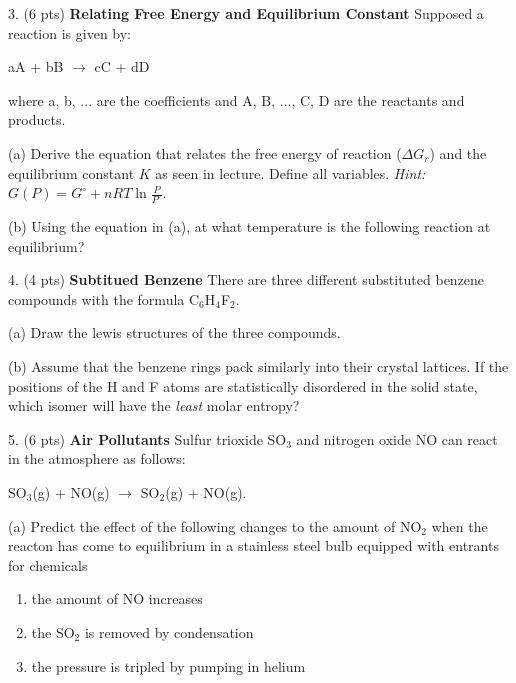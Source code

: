 \documentclass[11pt]{article}
\begin{document}
\vspace{3in}

3. (6 pts) \textbf{Relating Free Energy and Equilibrium Constant} Supposed a reaction
is given by:
\begin{center}
  aA + bB $\rightarrow$ cC + dD
\end{center}
where a, b, ... are the coefficients and A, B, ..., C, D are the reactants and products.

(a) Derive the equation that relates the free energy of reaction ($\Delta G_r$) and the
equilibrium constant $K$ as seen in lecture. Define all variables. \textit{Hint:}
$G(P) = G^\circ + nRT \ln\frac{P}{P^\circ}$.

(b) Using the equation in (a), at what temperature is the following reaction at equilibrium?
\begin{center}
\end{center}


\vspace{3in}

%
%

4. (4 pts) \textbf{Subtitued Benzene} There are three different substituted benzene compounds
with the formula C$_6$H$_4$F$_2$.

(a) Draw the lewis structures of the three compounds.

(b) Assume that the benzene rings pack similarly into their crystal lattices. If the positions
of the H and F atoms are statistically disordered in the solid state, which isomer will have
the \textit{least} molar entropy?

\vspace{3in}

5. (6 pts) \textbf{Air Pollutants} Sulfur trioxide SO$_3$ and nitrogen oxide NO can react in
the atmosphere as follows:
\begin{center}
  SO$_3$(g) + NO(g) $\rightarrow$ SO$_2$(g) + NO(g).
\end{center}
(a) Predict the effect of the following changes to the amount of NO$_2$ when the reacton
has come to equilibrium in a stainless steel bulb equipped with entrants for chemicals
\begin{enumerate}
\item the amount of NO increases
\item the SO$_2$ is removed by condensation
\item the pressure is tripled by pumping in helium
\end{enumerate}
\end{document}
